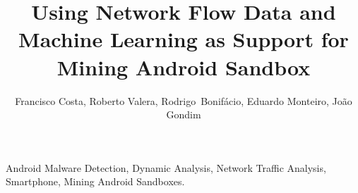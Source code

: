 \documentclass[10pt,journal,compsoc]{IEEEtran}
\begin{document}
\title{Using Network Flow Data and Machine Learning as Support for Mining Android Sandbox}


\author{Francisco Costa,
        Roberto Valera, 
        Rodrigo~Bonif\'{a}cio,
        Eduardo Monteiro, 
        Jo\~{a}o Gondim
}









\maketitle
\begin{IEEEkeywords}
Android Malware Detection, Dynamic Analysis, Network Traffic Analysis, Smartphone, Mining Android Sandboxes.
\end{IEEEkeywords}









\balance 



\end{document}
